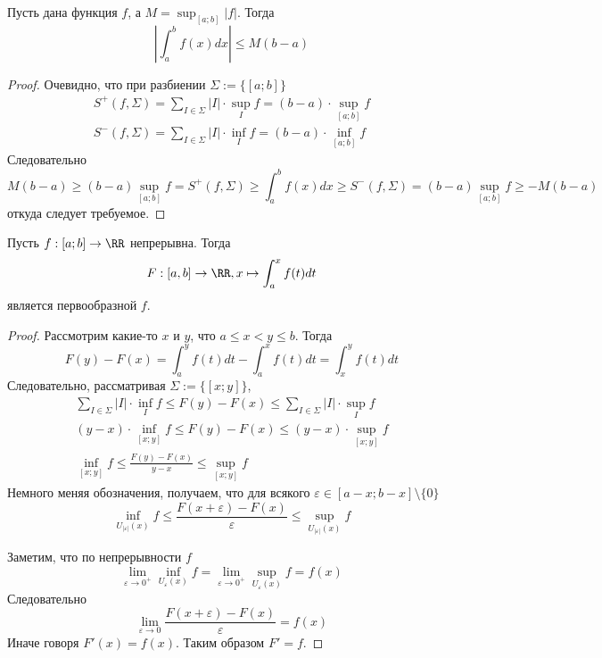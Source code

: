 \documentclass[12pt,a4paper]{article}
\begin{document}
    \begin{theorem}
        Пусть дана функция $f$, а $M = \sup_{[a; b]} |f|$. Тогда
        \[\left|\int_a^b f(x)dx\right| \leqslant M(b-a)\]
    \end{theorem}

    \begin{proof}
        Очевидно, что при разбиении $\Sigma := \{[a; b]\}$
        \begin{align*}
            S^+(f, \Sigma) = \sum_{I \in \Sigma} |I| \cdot \sup_I f = (b - a) \cdot \sup_{[a; b]} f\\
            S^-(f, \Sigma) = \sum_{I \in \Sigma} |I| \cdot \inf_I f = (b - a) \cdot \inf_{[a; b]} f
        \end{align*}
        Следовательно
        \[
            M(b-a)
            \geqslant (b-a)\sup_{[a; b]} f
            = S^+(f, \Sigma)
            \geqslant \int_a^b f(x)dx
            \geqslant S^-(f, \Sigma)
            = (b-a)\sup_{[a; b]} f
            \geqslant -M(b-a)
        \]
        откуда следует требуемое.
    \end{proof}

    \begin{theorem}
        Пусть $f: [a; b] \to \RR$ непрерывна. Тогда
        \[F: [a, b] \to \RR, x \mapsto \int_a^x f(t)dt\]
        является первообразной $f$.
    \end{theorem}

    \begin{proof}
        Рассмотрим какие-то $x$ и $y$, что $a \leqslant x < y \leqslant b$. Тогда
        \[F(y) - F(x) = \int_a^y f(t)dt - \int_a^x f(t)dt = \int_x^y f(t)dt\]
        Следовательно, рассматривая $\Sigma := \{[x; y]\}$,
        \begin{gather*}
            \sum_{I \in \Sigma} |I| \cdot \inf_I f \leqslant F(y) - F(x) \leqslant \sum_{I \in \Sigma} |I| \cdot \sup_I f\\
            (y-x) \cdot \inf_{[x; y]} f \leqslant F(y) - F(x) \leqslant (y-x) \cdot \sup_{[x; y]} f\\
            \inf_{[x; y]} f \leqslant \frac{F(y) - F(x)}{y - x} \leqslant \sup_{[x; y]} f
        \end{gather*}
        Немного меняя обозначения, получаем, что для всякого $\varepsilon \in [a - x; b - x] \setminus \{0\}$
        \[\inf_{U_{|\varepsilon|}(x)} f \leqslant \frac{F(x + \varepsilon) - F(x)}{\varepsilon} \leqslant \sup_{U_{|\varepsilon|}(x)} f\]

        Заметим, что по непрерывности $f$
        \[\lim_{\varepsilon \to 0^+} \inf_{U_\varepsilon(x)} f = \lim_{\varepsilon \to 0^+} \sup_{U_\varepsilon(x)} f = f(x)\]
        Следовательно
        \[\lim_{\varepsilon \to 0} \frac{F(x + \varepsilon) - F(x)}{\varepsilon} = f(x)\]
        Иначе говоря $F'(x) = f(x)$. Таким образом $F' = f$.
    \end{proof}
\end{document}
